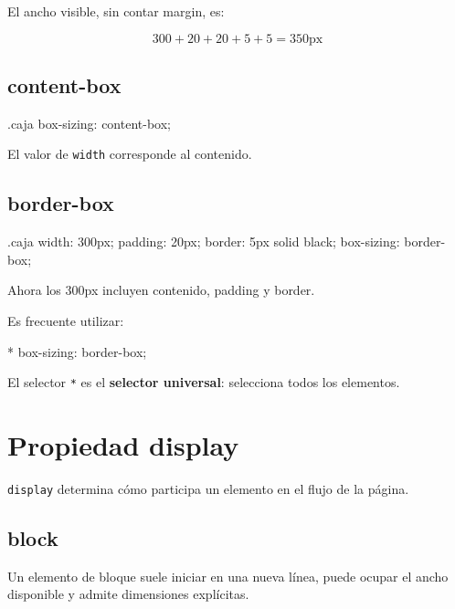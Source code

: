 \documentclass[11pt]{article}
\begin{document}
    El ancho visible, sin contar margin, es:

    \[
    300 + 20 + 20 + 5 + 5 = 350\text{px}
    \]

    \subsection{content-box}

    \begin{csscodedark}
        .caja {
            box-sizing: content-box;
        }
    \end{csscodedark}

    El valor de \texttt{width} corresponde al contenido.

    \subsection{border-box}

    \begin{csscodedark}
        .caja {
            width: 300px;
            padding: 20px;
            border: 5px solid black;
            box-sizing: border-box;
        }
    \end{csscodedark}

    Ahora los 300px incluyen contenido, padding y border.

    Es frecuente utilizar:

    \begin{csscodedark}
        * {
            box-sizing: border-box;
        }
    \end{csscodedark}

    El selector \texttt{*} es el \textbf{selector universal}: selecciona todos los elementos.

    \section{Propiedad display}

    \texttt{display} determina cómo participa un elemento en el flujo de la página.

    \subsection{block}

    Un elemento de bloque suele iniciar en una nueva línea, puede ocupar el ancho disponible y admite dimensiones explícitas.
\end{document}
